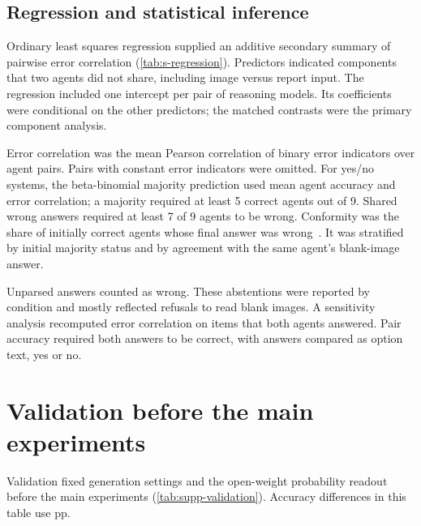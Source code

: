 \subsection{Regression and statistical inference}
Ordinary least squares regression supplied an additive secondary summary of pairwise error correlation (\cref{tab:s-regression}). Predictors indicated components that two agents did not share, including image versus report input. The regression included one intercept per pair of reasoning models. Its coefficients were conditional on the other predictors; the matched contrasts were the primary component analysis.

Error correlation was the mean Pearson correlation of binary error indicators over agent pairs. Pairs with constant error indicators were omitted. For yes/no systems, the beta-binomial majority prediction used mean agent accuracy and error correlation; a majority required at least 5 correct agents out of 9. Shared wrong answers required at least 7 of 9 agents to be wrong. Conformity was the share of initially correct agents whose final answer was wrong~\cite{asch1956conformity,demystifying_mad}. It was stratified by initial majority status and by agreement with the same agent's blank-image answer.

Unparsed answers counted as wrong. These abstentions were reported by condition and mostly reflected refusals to read blank images. A sensitivity analysis recomputed error correlation on items that both agents answered. Pair accuracy required both answers to be correct, with answers compared as option text, yes or no.

\section{Validation before the main experiments}\label{sec:supp-validation}

Validation fixed generation settings and the open-weight probability readout before the main experiments (\cref{tab:supp-validation}). Accuracy differences in this table use pp.

